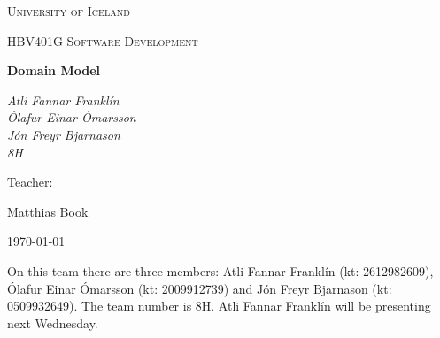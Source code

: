 \documentclass{article}
\begin{document}
\begin{titlepage}
	\centering
	{\scshape\LARGE University of Iceland \par}
	\vspace{1cm}
	{\scshape\Large HBV401G Software Development \par}
	\vspace{1.5cm}
	{\huge\bfseries Domain Model \par}
	\vspace{2cm}
	{\Large\itshape Atli Fannar Franklín \\ Ólafur Einar Ómarsson \\ Jón Freyr Bjarnason \\ 8H\par}
	\vfill
	Teacher: \par
	Matthias Book \par 

	\vfill

	{\large \today\par}
\end{titlepage}

On this team there are three members: Atli Fannar Franklín (kt: 2612982609), Ólafur Einar Ómarsson (kt: 2009912739) and Jón Freyr Bjarnason (kt: 0509932649). The team number is 8H. Atli Fannar Franklín will be presenting next Wednesday.  \\
\end{document}
